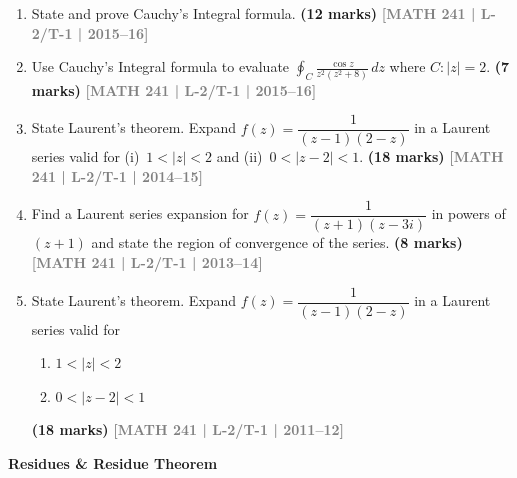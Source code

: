 \documentclass[12pt,a4paper]{article}
\newcommand{\yr}[1]{\hfill\textcolor{gray}{\small\textbf{[#1]}}}
\newcommand{\mk}[1]{\textcolor{orange!70!black}{\small\textbf{(#1 marks)}}}
\newcommand{\subtopic}[2]{%
  \vspace{10pt}
  \noindent\begin{tcolorbox}[colback=#1!8,colframe=#1,boxrule=0.6pt,arc=4pt,
    left=6pt,right=6pt,top=4pt,bottom=4pt]
    \small\bfseries\textcolor{#1}{#2}
  \end{tcolorbox}
  \vspace{2pt}
}
\begin{document}
\begin{enumerate}
\item State and prove Cauchy's Integral formula.
\mk{12} \yr{MATH 241 | L-2/T-1 | 2015--16}

\item Use Cauchy's Integral formula to evaluate $\displaystyle\oint_{C}\frac{\cos z}{z^{2}(z^{2}+8)}\,dz$ where $C:|z|=2$.
\mk{7} \yr{MATH 241 | L-2/T-1 | 2015--16}

\item State Laurent's theorem. Expand $f(z)=\dfrac{1}{(z-1)(2-z)}$ in a Laurent series valid for (i)~$1<|z|<2$ and (ii)~$0<|z-2|<1$.
\mk{18} \yr{MATH 241 | L-2/T-1 | 2014--15}

\item Find a Laurent series expansion for $f(z)=\dfrac{1}{(z+1)(z-3i)}$ in powers of $(z+1)$ and state the region of convergence of the series.
\mk{8} \yr{MATH 241 | L-2/T-1 | 2013--14}

\item State Laurent's theorem. Expand $f(z)=\dfrac{1}{(z-1)(2-z)}$ in a Laurent series valid for
\begin{enumerate}
  \item $1<|z|<2$
  \item $0<|z-2|<1$
\end{enumerate}
\mk{18} \yr{MATH 241 | L-2/T-1 | 2011--12}

\end{enumerate}

\subtopic{cE}{Residues \& Residue Theorem}
\label{sub:s5-residue}
\end{document}
